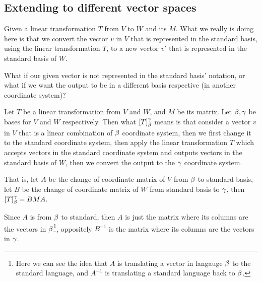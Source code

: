\documentclass[11pt, cyan, night, 1in]{LatexTemplate/hw}
\begin{document}
\subsection{Extending to different vector spaces}

Given a linear transformation $T$ from $V$ to $W$ and its $M$. What we really is doing here is that we convert the vector $v$ in $V$ that is represented in the standard basis, using the linear transformation $T$, to a new vector $v'$ that is represented in the standard basis of $W$.

What if our given vector is not represented in the standard basis' notation, or what if we want the output to be in a different basis respective (in another coordinate system)? 

Let $T$ be a linear transformation from $V$ and $W$, and $M$ be its matrix. Let $\beta, \gamma$ be bases for $V$ and $W$ respectively. Then what $[T]_\beta^\gamma$ means is that consider a vector $v$ in $V$ that is a linear combination of $\beta$ coordinate system, then we first change it to the standard coordinate system, then apply the linear transformation $T$ which accepts vectors in the standard coordinate system and outputs vectors in the standard basis of $W$, then we convert the output to the $\gamma$ coordinate system.

That is, let $A$ be the change of coordinate matrix of $V$ from $\beta$ to standard basis, let $B$ be the change of coordinate matrix of $W$ from standard basis to $\gamma$, then $[T]_\beta^\gamma = BM A$. 

Since $A$ is from $\beta$ to standard, then $A$ is just the matrix where its columns are the vectors in $\beta$\footnote{Here we can see the idea that $A$ is translating a vector in langauge $\beta$ to the standard language, and $A^{-1}$ is translating a standard language back to $\beta$.}, oppositely $B^{-1}$ is the matrix where its columns are the vectors in $\gamma$.
\end{document}
